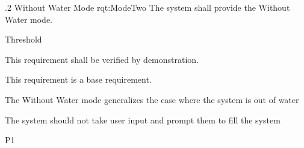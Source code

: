 \ONERQMTV
{\RqtNumberBase.2}
{Without Water Mode}
{rqt:ModeTwo}
{The system shall provide the Without Water mode.}
{
	\item [Phase 1] Threshold
}
{This requirement shall be verified by demonstration.}
{
	\item [N/A] This requirement is a base requirement.
}
{
	\item The Without Water mode generalizes the case where the system is out of water
	\item The system should not take user input and prompt them to fill the system
}
{P1}
